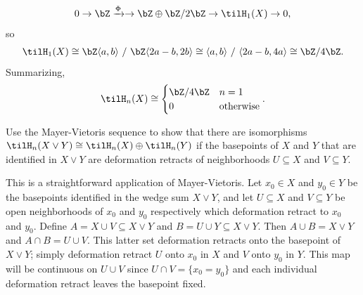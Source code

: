 \begin{homework}[e]
\begin{prf}
    \begin{align*}
      0 \to \bZ \xrightarrow{\Phi} \to \bZ\oplus \bZ/2\bZ \to \tilH_1(X) \to 0,
    \end{align*}
    so
    \begin{align*}
      \tilH_1(X) \cong \bZ\langle a, b \rangle ~/~ \bZ\langle 2a - b, 2b \rangle \cong \langle a, b \rangle ~/~ \langle 2a - b, 4a \rangle \cong \bZ/4\bZ.
    \end{align*}
    Summarizing,
    \begin{align*}
      \tilH_n(X) \cong
      \begin{cases}
        \bZ/4\bZ & n = 1 \\
        0 & \text{otherwise}
      \end{cases}.
    \end{align*}
  \end{prf}
   Use the Mayer-Vietoris sequence to show that there are isomorphisms $\tilH_n(X\vee Y) \cong \tilH_n(X) \oplus \tilH_n(Y)$ if the basepoints of $X$ and $Y$ that are identified in $X\vee Y$ are deformation retracts of neighborhoods $U\subseteq X$ and $V\subseteq Y$.
  \begin{prf}
    This is a straightforward application of Mayer-Vietoris. Let $x_0 \in X$ and $y_0 \in Y$ be the basepoints identified in the wedge sum $X\vee Y$, and let $U\subseteq X$ and $V\subseteq Y$ be open neighborhoods of $x_0$ and $y_0$ respectively which deformation retract to $x_0$ and $y_0$. Define $A = X\cup V \subseteq X\vee Y$ and $B = U\cup Y \subseteq X\vee Y$. Then $A\cup B = X \vee Y$ and $A \cap B = U \cup V$. This latter set deformation retracts onto the basepoint of $X\vee Y$; simply deformation retract $U$ onto $x_0$ in $X$ and $V$ onto $y_0$ in $Y$. This map will be continuous on $U \cup V$ since $U\cap V = \{x_0 = y_0\}$ and each individual deformation retract leaves the basepoint fixed.


\end{prf}
\end{homework}

